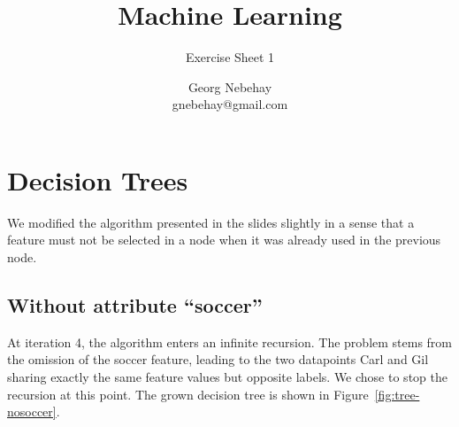 \documentclass{scrartcl}
\title{Machine Learning}
\subtitle{Exercise Sheet 1}
\author{Georg Nebehay\\gnebehay@gmail.com}
\date{}
\begin{document}
\maketitle

\section{Decision Trees}

We modified the algorithm presented in the slides slightly in a sense that
a feature must not be selected in a node when it was already used in the previous node.



\subsection{Without attribute ``soccer''}

At iteration 4, the algorithm enters an infinite recursion.
The problem stems from the omission of the soccer feature,
leading to the two datapoints Carl and Gil sharing exactly the same feature values but opposite labels.
We chose to stop the recursion at this point.
The grown decision tree is shown in Figure~\ref{fig:tree-nosoccer}.
\end{document}
